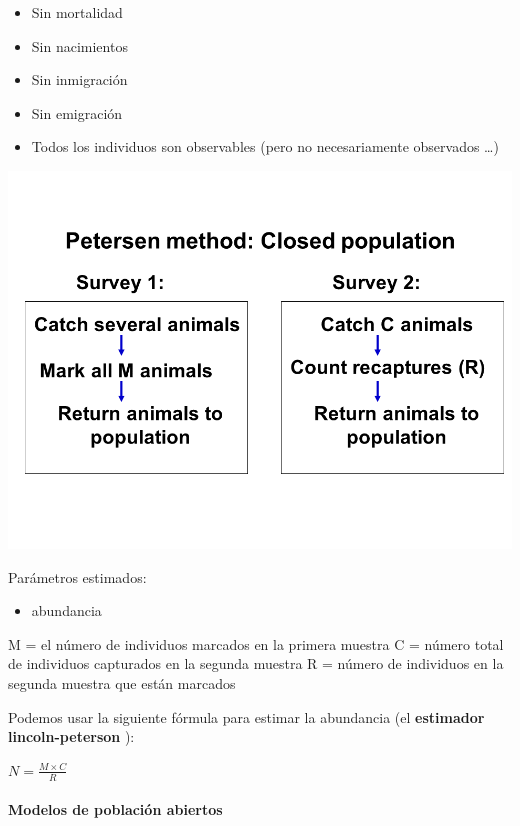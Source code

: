 \documentclass[
]{article}
\providecommand{\tightlist}{%
  \setlength{\itemsep}{0pt}\setlength{\parskip}{0pt}}
\begin{document}
\begin{itemize}
\tightlist
\item
  Sin mortalidad
\item
  Sin nacimientos
\item
  Sin inmigración
\item
  Sin emigración
\item
  Todos los individuos son observables (pero no necesariamente
  observados \ldots)
\end{itemize}

\includegraphics{figures/peterson1.png}

Parámetros estimados:

\begin{itemize}
\tightlist
\item
  abundancia
\end{itemize}

M = el número de individuos marcados en la primera muestra C = número
total de individuos capturados en la segunda muestra R = número de
individuos en la segunda muestra que están marcados

Podemos usar la siguiente fórmula para estimar la abundancia (el
\textbf{estimador lincoln-peterson }):

\(N = \frac{M \times C}{R}\)

\hypertarget{modelos-de-poblaciuxf3n-abiertos}{%
\paragraph{Modelos de población
abiertos}\label{modelos-de-poblaciuxf3n-abiertos}}
\end{document}
